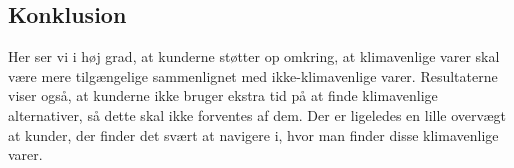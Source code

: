 \documentclass[
]{article}
\begin{document}
\hypertarget{konklusion-3}{%
\subsection{Konklusion}\label{konklusion-3}}

Her ser vi i høj grad, at kunderne støtter op omkring, at klimavenlige
varer skal være mere tilgængelige sammenlignet med ikke-klimavenlige
varer. Resultaterne viser også, at kunderne ikke bruger ekstra tid på at
finde klimavenlige alternativer, så dette skal ikke forventes af dem.
Der er ligeledes en lille overvægt at kunder, der finder det svært at
navigere i, hvor man finder disse klimavenlige varer.
\end{document}
